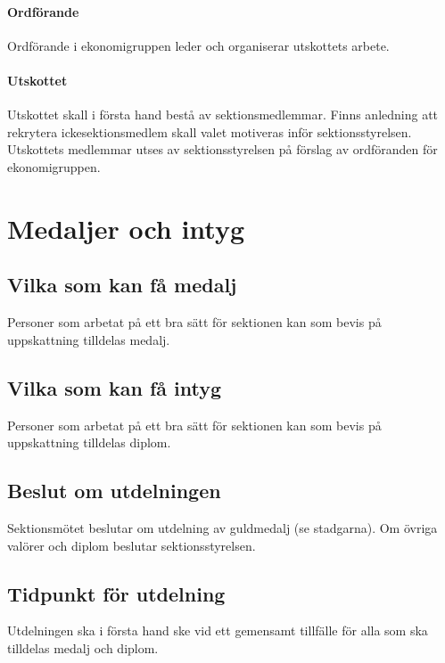 \documentclass{datateknologsektionen-document}
\begin{document}
\paragraph{Ordförande}
Ordförande i ekonomigruppen leder och organiserar utskottets arbete.
\paragraph{Utskottet}
Utskottet skall i första hand bestå av sektionsmedlemmar. Finns anledning att rekrytera ickesektionsmedlem skall valet motiveras inför sektionsstyrelsen. Utskottets medlemmar utses av sektionsstyrelsen på förslag av ordföranden för ekonomigruppen.

\section{Medaljer och intyg}
\subsection{Vilka som kan få medalj}
Personer som arbetat på ett bra sätt för sektionen kan som bevis på uppskattning tilldelas medalj.
\subsection{Vilka som kan få intyg}
Personer som arbetat på ett bra sätt för sektionen kan som bevis på uppskattning tilldelas diplom.
\subsection{Beslut om utdelningen}
Sektionsmötet beslutar om utdelning av guldmedalj (se stadgarna). Om övriga valörer och diplom
beslutar sektionsstyrelsen.
\subsection{Tidpunkt för utdelning}
Utdelningen ska i första hand ske vid ett gemensamt tillfälle för alla som ska tilldelas medalj och
diplom.
\end{document}
